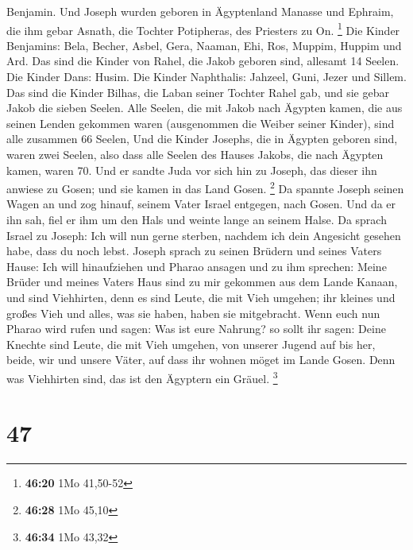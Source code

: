 Benjamin.  Und Joseph wurden geboren in Ägyptenland
Manasse und Ephraim, die ihm gebar Asnath, die Tochter Potipheras, des
Priesters zu On. \footnote{\textbf{46:20} 1Mo 41,50-52} 
Die Kinder Benjamins: Bela, Becher, Asbel, Gera, Naaman, Ehi, Ros,
Muppim, Huppim und Ard.  Das sind die Kinder von Rahel,
die Jakob geboren sind, allesamt 14 Seelen.  Die Kinder
Dans: Husim.  Die Kinder Naphthalis: Jahzeel, Guni, Jezer
und Sillem.  Das sind die Kinder Bilhas, die Laban seiner
Tochter Rahel gab, und sie gebar Jakob die sieben Seelen.
 Alle Seelen, die mit Jakob nach Ägypten kamen, die aus
seinen Lenden gekommen waren (ausgenommen die Weiber seiner Kinder),
sind alle zusammen 66 Seelen,  Und die Kinder Josephs,
die in Ägypten geboren sind, waren zwei Seelen, also dass alle Seelen
des Hauses Jakobs, die nach Ägypten kamen, waren 70.  Und
er sandte Juda vor sich hin zu Joseph, das dieser ihn anwiese zu Gosen;
und sie kamen in das Land Gosen. \footnote{\textbf{46:28} 1Mo 45,10}
 Da spannte Joseph seinen Wagen an und zog hinauf, seinem
Vater Israel entgegen, nach Gosen. Und da er ihn sah, fiel er ihm um den
Hals und weinte lange an seinem Halse.  Da sprach Israel
zu Joseph: Ich will nun gerne sterben, nachdem ich dein Angesicht
gesehen habe, dass du noch lebst.  Joseph sprach zu
seinen Brüdern und seines Vaters Hause: Ich will hinaufziehen und Pharao
ansagen und zu ihm sprechen: Meine Brüder und meines Vaters Haus sind zu
mir gekommen aus dem Lande Kanaan,  und sind Viehhirten,
denn es sind Leute, die mit Vieh umgehen; ihr kleines und großes Vieh
und alles, was sie haben, haben sie mitgebracht.  Wenn
euch nun Pharao wird rufen und sagen: Was ist eure Nahrung?
 so sollt ihr sagen: Deine Knechte sind Leute, die mit
Vieh umgehen, von unserer Jugend auf bis her, beide, wir und unsere
Väter, auf dass ihr wohnen möget im Lande Gosen. Denn was Viehhirten
sind, das ist den Ägyptern ein Gräuel. \footnote{\textbf{46:34} 1Mo
  43,32}

\hypertarget{section-11}{%
\section{47}\label{section-11}}

